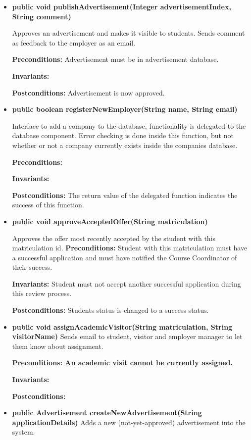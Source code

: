 \documentclass[11pt]{article}
\begin{document}
\begin{itemize}

\item{\textbf{public void publishAdvertisement(Integer
    advertisementIndex, String comment)}

Approves an advertisement and makes it visible to students. Sends
comment as feedback to the employer as an email.

\textbf{Preconditions:} Advertisement must be in advertisement database.

\textbf{Invariants:}

\textbf{Postconditions:} Advertisement is now approved.}
\item{\textbf{public boolean registerNewEmployer(String name, String email)} 

Interface to add a company to the database, functionality is delegated to the
database component.
Error checking is done inside this function, but not whether or not a company
currently exists inside the companies database.

\textbf{Preconditions:} 

\textbf{Invariants:}

\textbf{Postconditions:} The return value of the delegated function indicates
the success of this function.}
\item{\textbf{public void approveAcceptedOffer(String matriculation)}

Approves the offer most recently accepted by the student with this matriculation
id. 
\textbf{Preconditions:} Student with this matriculation must have a successful
application and must have notified the Course Coordinator of their success.

\textbf{Invariants:} Student must not accept another successful application
during this review process.

\textbf{Postconditions:} Students status is changed to a success status.}
\item{\textbf{public void assignAcademicVisitor(String matriculation, String
    visitorName)}
Sends email to student, visitor and employer manager to let them know about
assignment. 

\textbf{Preconditions: An academic visit cannot be currently assigned.}

\textbf{Invariants:} 

\textbf{Postconditions:} }
\item{\textbf{public Advertisement createNewAdvertisement(String
    applicationDetails)}
Adds a new (not-yet-approved) advertisement into the system.

}
\end{itemize}
\end{document}
